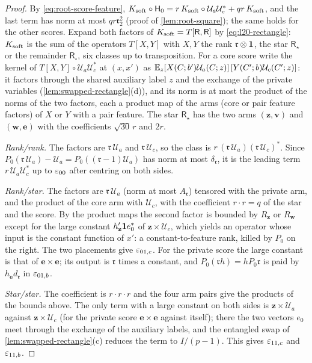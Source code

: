 \begin{proof}
By \eqref{eq:root-score-feature}, $K_{\rm soft}\circ\mathsf H_{0}=r\,K_{\rm soft}\circ\mathcal U_a\mathcal U_c^*
+qr\,K_{\rm soft}$, and the last term has norm at most $qr\mathfrak r_2^2$ (proof of
\cref{lem:root-square}); the same holds for the other scores. Expand both factors of
$K_{\rm soft}=T[\mathsf R,\mathsf R]$ by \eqref{eq:l20-rectangle}: $K_{\rm soft}$ is the
sum of the operators $T[X,Y]$ with $X,Y$ the rank $\mathfrak r\otimes\mathbf 1$, the star
$\mathsf R_\star$ or the remainder $\mathsf R_\circ$, six classes up to transposition. For a
core score write the kernel of $T[X,Y]\circ\mathcal U_a\mathcal U_c^*$ at $(x,x')$ as
$\mathbb E_z[X(C;b')\mathcal U_a(C;z)]\,[Y(C';b)\mathcal U_c(C';z)]$: it factors through the
shared auxiliary label $z$ and the exchange of the private variables
(\cref{lem:swapped-rectangle}(d)), and its norm is at most the product of the norms of
the two factors, each a product map of the arms (core or pair feature
factors) of $X$ or $Y$ with a pair feature. The
star $\mathsf R_\star$ has the two arms $(\mathbf z,\mathbf v)$ and $(\mathbf w,\mathbf e)$
with the coefficients $\sqrt{30}\,r$ and $2r$.

\emph{Rank/rank.} The factors are $\mathfrak r\,\mathcal U_a$ and $\mathfrak r\,\mathcal U_c$,
so the class is $r\,(\mathfrak r\,\mathcal U_a)(\mathfrak r\,\mathcal U_c)^*$. Since
$P_0(\mathfrak r\,\mathcal U_a)-\mathcal U_a=P_0((\mathfrak r-1)\mathcal U_a)$ has norm at most
$\delta_{\mathfrak r}$, it is the leading term $r\,\mathcal U_a\mathcal U_c^*$ up to
$\varepsilon_{00}$ after centring on both sides.

\emph{Rank/star.} The factors are $\mathfrak r\,\mathcal U_a$ (norm at most $A_{\mathfrak r}$)
tensored with the private arm, and the product of the core arm with $\mathcal U_c$, with the
coefficient $r\cdot r=q$ of the star and the score. By the product maps the second factor is
bounded by $R_{\mathbf z}$ or $R_{\mathbf w}$ except for the large constant
$h'_{\mathbf z}\mathbf 1 e_0^*$ of $\mathbf z\times\mathcal U_c$, which yields an operator whose
input is the constant function of $x'$: a constant-to-feature rank, killed by $P_0$ on the
right. The two placements give $\varepsilon_{01,c}$. For the private score the large constant is
that of $\mathbf e\times\mathbf e$; its output is $\mathfrak r$ times a constant, and
$P_0(\mathfrak r h)=hP_0\mathfrak r$ is paid by $h_{\mathbf e}d_{\mathfrak r}$ in $\varepsilon_{01,b}$.

\emph{Star/star.} The coefficient is $r\cdot r\cdot r$ and the four arm pairs give the
products of the bounds above. The only term with a large constant on both sides is
$\mathbf z\times\mathcal U_a$ against $\mathbf z\times\mathcal U_c$ (for the private score
$\mathbf e\times\mathbf e$ against itself); there the two vectors $e_0$ meet through the
exchange of the auxiliary labels, and the entangled swap of
\cref{lem:swapped-rectangle}(c) reduces the term to $I/(p-1)$. This gives $\varepsilon_{11,c}$ and
$\varepsilon_{11,b}$.


\end{proof}
